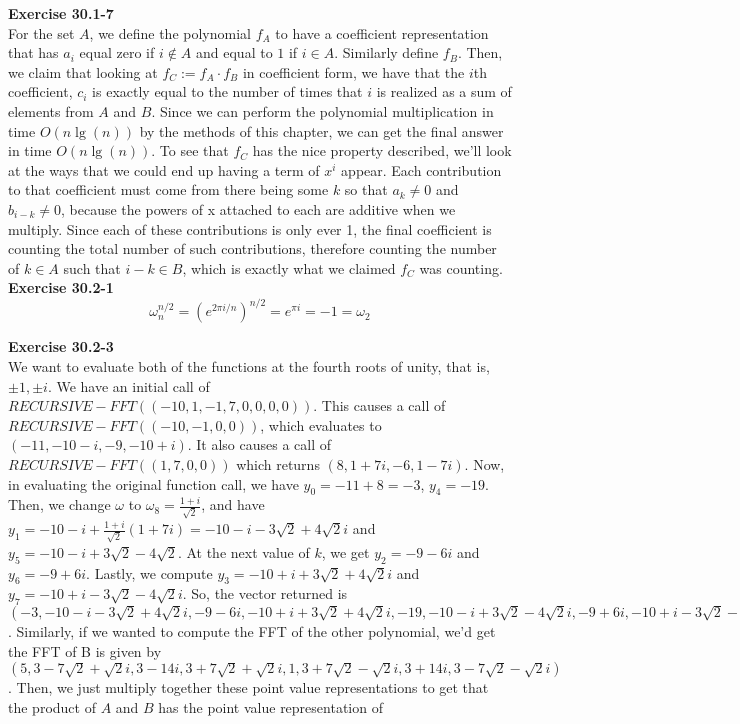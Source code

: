 \documentclass{article}
\begin{document}
\noindent\textbf{Exercise 30.1-7}\\
For the set $A$, we define the polynomial $f_A$ to have a coefficient representation that has $a_i$ equal zero if $i\not\in A$ and equal to $1$ if $i\in A$. Similarly define $f_B$. Then, we claim that looking at $f_C:=f_A \cdot f_B$ in coefficient form, we have that the $i$th coefficient, $c_i$ is exactly equal to the number of times that $i$ is realized as a sum of elements from $A$ and $B$. Since we can perform the polynomial multiplication in time $O(n\lg(n))$ by the methods of this chapter, we can get the final answer in time $O(n\lg(n))$. To see that $f_C$ has the nice property described, we'll look at the ways that we could end up having a term of $x^i$ appear. Each contribution to that coefficient must come from there being some $k$ so that $a_k \neq0$ and $b_{i-k}\neq 0$, because the powers of x attached to each are additive when we multiply. Since each of these contributions is only ever 1, the final coefficient is counting the total number of such contributions, therefore counting the number of $k\in A$ such that $i-k\in B$, which is exactly what we claimed $f_C$ was counting.\\



\noindent\textbf{Exercise 30.2-1}\\

\[
\omega_{n}^{n/2} = \left(e^{2\pi i/n} \right)^{n/2} = e^{\pi i} = -1 = \omega_2
\]



\noindent\textbf{Exercise 30.2-3}\\
We want to evaluate both of the functions at the fourth roots of unity, that is, $\pm1, \pm i$. We have an initial call of $RECURSIVE-FFT((-10,1,-1,7,0,0,0,0))$. This causes a call of $RECURSIVE-FFT((-10,-1,0,0))$, which evaluates to $(-11,-10-i,-9,-10+i)$. It also causes a call of $ RECURSIVE-FFT((1,7,0,0))$ which returns $(8,1+7i,-6,1-7i)$. Now, in evaluating the original function call, we have $y_0 = -11 +8 = -3$, $y_4 = -19$. Then, we change $\omega$ to $\omega_8 = \frac{1+i}{\sqrt{2}}$, and have $y_1 =-10-i + \frac{1+i}{\sqrt{2}}(1+7i) = -10 -i -3\sqrt{2} + 4\sqrt{2}i$ and $y_5 = -10 -i+ 3\sqrt{2} - 4\sqrt{2}$. At the next value of $k$, we get $y_2 =-9 -6i$ and $y_6 = -9 +6i$. Lastly, we compute $y_3 =-10+i+3\sqrt{2} +4\sqrt{2}i$ and $y_7 = -10+i-3\sqrt{2}-4\sqrt{2} i$. So, the vector returned is $(-3,-10-i-3\sqrt{2} +4\sqrt{2}i,-9-6i,-10+i+3\sqrt{2} +4\sqrt{2}i,-19,-10-i+3\sqrt{2}-4\sqrt{2}i,-9+6i,-10+i-3\sqrt{2}-4\sqrt{2} i)$. Similarly, if we wanted to compute the FFT of the other polynomial, we'd get the FFT of B is given by $(5,3-7\sqrt{2}+ \sqrt{2}i,3-14i,3+7\sqrt{2}+\sqrt{2}i,1,3+7\sqrt{2}-\sqrt{2}i,3+14i, 3-7\sqrt{2}-\sqrt{2}i)$. Then, we just multiply together these point value representations to get that the product of $A$ and $B$ has the point value representation of 
\end{document}
